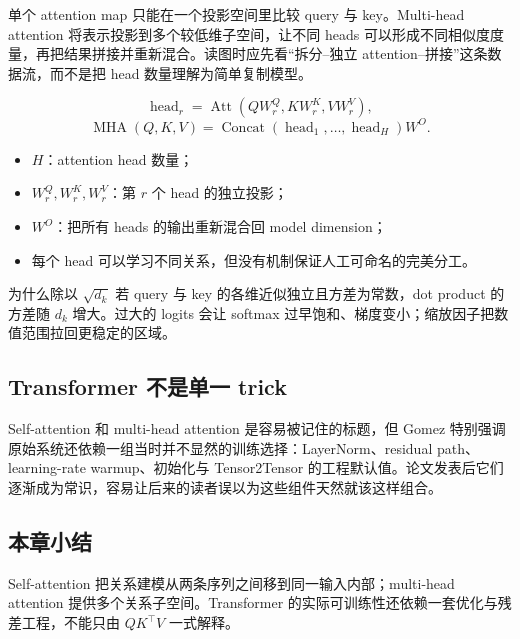 单个 attention map 只能在一个投影空间里比较 query 与 key。Multi-head attention 将表示投影到多个较低维子空间，让不同 heads 可以形成不同相似度度量，再把结果拼接并重新混合。读图时应先看“拆分--独立 attention--拼接”这条数据流，而不是把 head 数量理解为简单复制模型。


\[
\operatorname{head}_r
=\operatorname{Att}\!\left(QW_r^Q,KW_r^K,VW_r^V\right),
\]
\[
\operatorname{MHA}(Q,K,V)
=\operatorname{Concat}(\operatorname{head}_1,\ldots,\operatorname{head}_H)W^O.
\]

\begin{itemize}
  \item $H$：attention head 数量；
  \item $W_r^Q,W_r^K,W_r^V$：第 $r$ 个 head 的独立投影；
  \item $W^O$：把所有 heads 的输出重新混合回 model dimension；
  \item 每个 head 可以学习不同关系，但没有机制保证人工可命名的完美分工。
\end{itemize}


\begin{knowledgebox}{为什么除以 $\sqrt{d_k}$}
若 query 与 key 的各维近似独立且方差为常数，dot product 的方差随 $d_k$ 增大。过大的 logits 会让 softmax 过早饱和、梯度变小；缩放因子把数值范围拉回更稳定的区域。
\end{knowledgebox}

\subsection{Transformer 不是单一 trick}

Self-attention 和 multi-head attention 是容易被记住的标题，但 Gomez 特别强调原始系统还依赖一组当时并不显然的训练选择：LayerNorm、residual path、learning-rate warmup、初始化与 Tensor2Tensor 的工程默认值。论文发表后它们逐渐成为常识，容易让后来的读者误以为这些组件天然就该这样组合。



\subsection{本章小结}

Self-attention 把关系建模从两条序列之间移到同一输入内部；multi-head attention 提供多个关系子空间。Transformer 的实际可训练性还依赖一套优化与残差工程，不能只由 $QK^{\top}V$ 一式解释。

